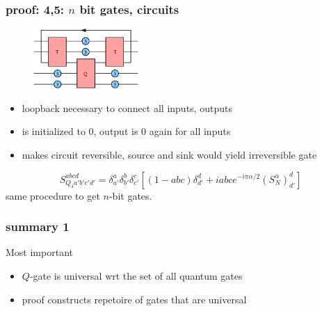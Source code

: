 \documentclass{beamer}
\begin{document}
\begin{frame}
	\frametitle{proof: 4,5: $n$ bit gates, circuits}
	\begin{figure}
		\centering
		\includegraphics[width=4cm]{four_bit.png}
	\end{figure}
	\begin{itemize}
		\item loopback necessary to connect all inputs, outputs
		\item is initialized to $0$, output is $0$ again for all inputs
		\item makes circuit reversible, source and sink would yield irreversible gate
	\end{itemize}
	\begin{equation*}
     S_{Q_4a'b'c'd'}^{abcd}=\delta_{a'}^{a}\delta_{b'}^b\delta_{c'}^c[(1-abc)\delta_{d'}^d+iabc e^{-i\pi\alpha/2}(S_N^\alpha)_{d'}^d]
    \end{equation*}
    same procedure to get $n$-bit gates.\\

\end{frame}
%
\begin{frame}
	\frametitle{summary 1}
    \begin{block}{Most important}
        \begin{itemize}
            \item $Q$-gate is universal wrt the set of all quantum gates
            \item proof constructs repetoire of gates that are universal
        \end{itemize}
    \end{block}
\end{frame}
%
\begin{frame}
 \tableofcontents
\end{frame}
%
%
\end{document}
